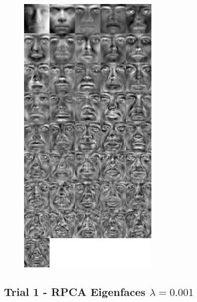 \documentclass[11pt]{scrartcl} %
\theoremstyle{plain}
\begin{document}
\begin{figure}[H]
\centering
\includegraphics[width=0.6\textwidth]{figures/trial3rpca0dot005eigenfaces.jpg}
\end{figure}

\subsection{Trial 1 - RPCA Eigenfaces $\lambda = 0.001$}
\end{document}
